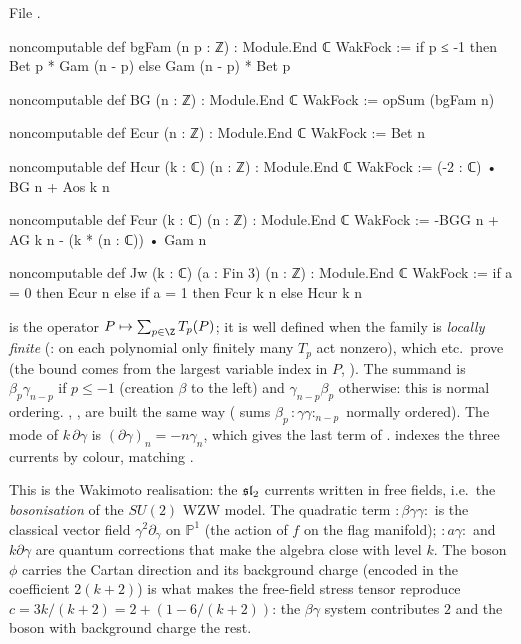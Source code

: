 \noindent File .
\begin{leancode}
noncomputable def bgFam (n p : ℤ) : Module.End ℂ WakFock :=
  if p ≤ -1 then Bet p * Gam (n - p) else Gam (n - p) * Bet p

noncomputable def BG (n : ℤ) : Module.End ℂ WakFock := opSum (bgFam n)

noncomputable def Ecur (n : ℤ) : Module.End ℂ WakFock := Bet n

noncomputable def Hcur (k : ℂ) (n : ℤ) : Module.End ℂ WakFock := (-2 : ℂ) • BG n + Aos k n

noncomputable def Fcur (k : ℂ) (n : ℤ) : Module.End ℂ WakFock :=
  -BGG n + AG k n - (k * (n : ℂ)) • Gam n

noncomputable def Jw (k : ℂ) (a : Fin 3) (n : ℤ) : Module.End ℂ WakFock :=
  if a = 0 then Ecur n else if a = 1 then Fcur k n else Hcur k n
\end{leancode}

\begin{dictionary}
 is the operator $P\mapsto\sum_{p\in\Z}T_p(P)$; it is well defined when the family is
\emph{locally finite} (: on each polynomial only finitely many $T_p$ act nonzero), which
 etc.\ prove (the bound comes from the largest variable index in $P$, ). The
summand  is $\beta_p\gamma_{n-p}$ if $p\le-1$ (creation $\beta$ to the left) and
$\gamma_{n-p}\beta_p$ otherwise: this is normal ordering. , ,  are built the
same way ( sums $\beta_p\,{:}\gamma\gamma{:}_{n-p}$ normally ordered). The mode of
$k\,\partial\gamma$ is $(\partial\gamma)_n = -n\gamma_n$, which gives the last term of . 
indexes the three currents by colour, matching .
\end{dictionary}

\begin{physics}
This is the Wakimoto realisation: the $\mathfrak{sl}_2$ currents written in free fields, i.e.\ the
\emph{bosonisation} of the $SU(2)$ WZW model. The quadratic term ${:}\beta\gamma\gamma{:}$ is the
classical vector field $\gamma^2\partial_\gamma$ on $\mathbb{P}^1$ (the action of $f$ on the flag
manifold); ${:}a\gamma{:}$ and $k\partial\gamma$ are quantum corrections that make the algebra close with
level $k$. The boson $\phi$ carries the Cartan direction and its background charge (encoded in the
coefficient $2(k+2)$) is what makes the free-field stress tensor reproduce $c = 3k/(k+2) =
2 + (1 - 6/(k+2))$: the $\beta\gamma$ system contributes $2$ and the boson with background charge the
rest.
\end{physics}

